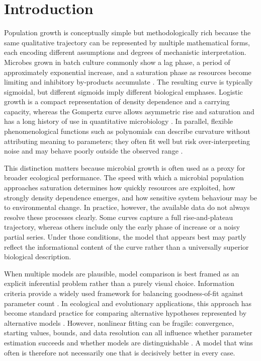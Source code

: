 \documentclass[11pt]{article}
\begin{document}
\section*{Introduction}

Population growth is conceptually simple but methodologically rich because the same qualitative trajectory can be represented by multiple mathematical forms, each encoding different assumptions and degrees of mechanistic interpretation. Microbes grown in batch culture commonly show a lag phase, a period of approximately exponential increase, and a saturation phase as resources become limiting and inhibitory by-products accumulate \citep{Zwietering1990,MichaCorradini2011}. The resulting curve is typically sigmoidal, but different sigmoids imply different biological emphases. Logistic growth is a compact representation of density dependence and a carrying capacity, whereas the Gompertz curve allows asymmetric rise and saturation and has a long history of use in quantitative microbiology \citep{Zwietering1990,Buchanan1997}. In parallel, flexible phenomenological functions such as polynomials can describe curvature without attributing meaning to parameters; they often fit well but risk over-interpreting noise and may behave poorly outside the observed range \citep{MichaCorradini2011}.

This distinction matters because microbial growth is often used as a proxy for broader ecological performance. The speed with which a microbial population approaches saturation determines how quickly resources are exploited, how strongly density dependence emerges, and how sensitive system behaviour may be to environmental change. In practice, however, the available data do not always resolve these processes clearly. Some curves capture a full rise-and-plateau trajectory, whereas others include only the early phase of increase or a noisy partial series. Under those conditions, the model that appears best may partly reflect the informational content of the curve rather than a universally superior biological description.

When multiple models are plausible, model comparison is best framed as an explicit inferential problem rather than a purely visual choice. Information criteria provide a widely used framework for balancing goodness-of-fit against parameter count \citep{Akaike1974,Schwarz1978}. In ecological and evolutionary applications, this approach has become standard practice for comparing alternative hypotheses represented by alternative models \citep{JohnsonOmland2004,BurnhamAnderson2002}. However, nonlinear fitting can be fragile: convergence, starting values, bounds, and data resolution can all influence whether parameter estimation succeeds and whether models are distinguishable \citep{MotulskyChristopoulos2004,Bolker2013}. A model that wins often is therefore not necessarily one that is decisively better in every case.
\end{document}
